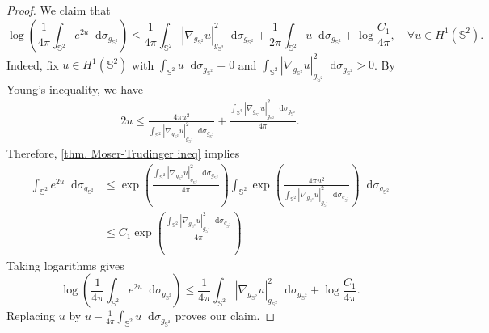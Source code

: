 \documentclass[11pt,a4paper,twoside]{amsart}
\newtheorem{sketch proof}{Sketch of the proof}[section]
\newcommand{\dd}{\mathop{}\!\mathrm{d}}
\begin{document}
\begin{proof}
    We claim that
    \begin{equation}\label{eq. weak Moser on sphere}
        \log\left( \frac{1}{4\pi}\int_{\mathbb{S}^2}e^{2u}
        \dd \sigma_{g_{\mathbb{S}^2}}\right)
        \leq \frac{1}{4\pi}
        \int_{\mathbb{S}^2}
        |\nabla_{g_{\mathbb{S}^2}} u|_{g_{\mathbb{S}^2}}^2
        \dd \sigma_{g_{\mathbb{S}^2}}
        +\frac{1}{2\pi}\int_{\mathbb{S}^2}u
        \dd \sigma_{g_{\mathbb{S}^2}}
        +\log\frac{C_1}{4\pi},
        \quad \forall u\in H^1(\mathbb{S}^2).
    \end{equation}
    Indeed, fix $u\in H^1(\mathbb{S}^2)$ with $\int_{\mathbb{S}^2} u
    \dd \sigma_{g_{\mathbb{S}^2}}=0$ and $\int_{\mathbb{S}^2} 
    |\nabla_{g_{\mathbb{S}^2}} u|_{g_{\mathbb{S}^2}}^2
    \dd \sigma_{g_{\mathbb{S}^2}}>0$. By Young's inequality, we have
    \begin{align*}
        2u
        \leq \frac{4\pi u^2}{\int_{\mathbb{S}^2}
        |\nabla_{g_{\mathbb{S}^2}} u|_{g_{\mathbb{S}^2}}^2
        \dd \sigma_{g_{\mathbb{S}^2}}}
        +\frac{\int_{\mathbb{S}^2} 
        |\nabla_{g_{\mathbb{S}^2}} u|_{g_{\mathbb{S}^2}}^2
        \dd \sigma_{g_{\mathbb{S}^2}}}{4\pi}.
    \end{align*}
    Therefore, \cref{thm. Moser-Trudinger ineq} implies
    \begin{align*}
        \int_{\mathbb{S}^2} e^{2u}
        \dd \sigma_{g_{\mathbb{S}^2}}
        & \leq
        \exp\left(\frac{\int_{\mathbb{S}^2} 
        |\nabla_{g_{\mathbb{S}^2}} u|_{g_{\mathbb{S}^2}}^2
        \dd \sigma_{g_{\mathbb{S}^2}}}{4\pi}
        \right)
        \int_{\mathbb{S}^2}\exp\left(
        \frac{4\pi u^2}{\int_{\mathbb{S}^2}
        |\nabla_{g_{\mathbb{S}^2}} u|_{g_{\mathbb{S}^2}}^2\dd \sigma_{g_{\mathbb{S}^2}}}
        \right)\dd \sigma_{g_{\mathbb{S}^2}}\\[3mm]
        & \leq C_1
        \exp\left(\frac{\int_{\mathbb{S}^2} 
        |\nabla_{g_{\mathbb{S}^2}} u|_{g_{\mathbb{S}^2}}^2
        \dd \sigma_{g_{\mathbb{S}^2}}}{4\pi}
        \right)
    \end{align*}
    Taking logarithms gives
   \[
   \log\left( \frac{1}{4\pi}\int_{\mathbb{S}^2}e^{2u}
        \dd \sigma_{g_{\mathbb{S}^2}}\right)
        \leq \frac{1}{4\pi}
        \int_{\mathbb{S}^2}
        |\nabla_{g_{\mathbb{S}^2}} u|_{g_{\mathbb{S}^2}}^2
        \dd \sigma_{g_{\mathbb{S}^2}}
        +\log\frac{C_1}{4\pi}.
   \]
   Replacing $u$ by $u-\frac{1}{4\pi}\int_{\mathbb{S}^2} u
    \dd \sigma_{g_{\mathbb{S}^2}}$ proves our claim.
    

\end{proof}
\end{document}
